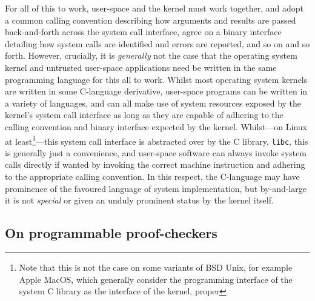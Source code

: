\documentclass[a4paper, UKenglish, cleveref, autoref, thm-restate]{lipics-v2021}
\begin{document}
For all of this to work, user-space and the kernel must work together, and adopt a common calling convention describing how arguments and results are passed back-and-forth across the system call interface, agree on a binary interface detailing how system calls are identified and errors are reported, and so on and so forth.
However, crucially, it is \emph{generally} not the case that the operating system kernel and untrusted user-space applications need be written in the same programming language for this all to work.
Whilst most operating system kernels are written in some C-language derivative, user-space programs can be written in a variety of languages, and can all make use of system resources exposed by the kernel's system call interface as long as they are capable of adhering to the calling convention and binary interface expected by the kernel.
Whilst---on Linux at least\footnote{Note that this is not the case on some variants of BSD Unix, for example Apple MacOS, which generally consider the programming interface of the system C library as the interface of the kernel, proper}---this system call interface is abstracted over by the C library, \texttt{libc}, this is generally just a convenience, and user-space software can always invoke system calls directly if wanted by invoking the correct machine instruction and adhering to the appropriate calling convention.
In this respect, the C-language may have prominence of the favoured language of system implementation, but by-and-large it is not \emph{special} or given an unduly prominent status by the kernel itself.

\subsection{On programmable proof-checkers}
\end{document}
